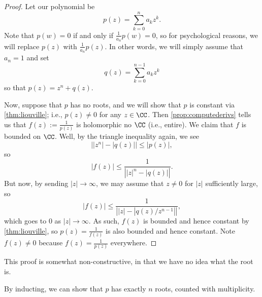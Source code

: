 \begin{proof}
	Let our polynomial be
	\[p(z)=\sum_{k=0}^na_kz^k.\]
	Note that $p(w)=0$ if and only if $\frac1{a_n}p(w)=0$, so for psychological reasons, we will replace $p(z)$ with $\frac1{a_n}p(z)$. In other words, we will simply assume that $a_n=1$ and set
	\[q(z)=\sum_{k=0}^{n-1}a_kz^k\]
	so that $p(z)=z^n+q(z)$.

	Now, suppose that $p$ has no roots, and we will show that $p$ is constant via \autoref{thm:liouville}; i.e., $p(z)\ne0$ for any $z\in\CC$. Then \autoref{prop:computederivs} tells us that $f(z):=\frac1{p(z)}$ is holomorphic no $\CC$ (i.e., entire). We claim that $f$ is bounded on $\CC$. Well, by the triangle inequality again, we see
	\[\left|\left|z^n\right|-|q(z)|\right|\le|p(z)|,\]
	so
	\[\left|f(z)\right|\le\frac1{\left||z|^n-|q(z)|\right|}.\]
	But now, by sending $|z|\to\infty$, we may assume that $z\ne0$ for $|z|$ sufficiently large, so
	\[\left|f(z)\right|\le\frac1{\left||z|-|q(z)/z^{n-1}|\right|},\]
	which goes to $0$ as $|z|\to\infty$. As such, $f(z)$ is bounded and hence constant by \autoref{thm:liouville}, so $p(z)=\frac1{f(z)}$ is also bounded and hence constant. Note $f(z)\ne0$ because $f(z)=\frac1{p(z)}$ everywhere.
\end{proof}
\begin{remark}
	This proof is somewhat non-constructive, in that we have no idea what the root is.
\end{remark}
\begin{remark}
	By inducting, we can show that $p$ has exactly $n$ roots, counted with multiplicity.
\end{remark}

